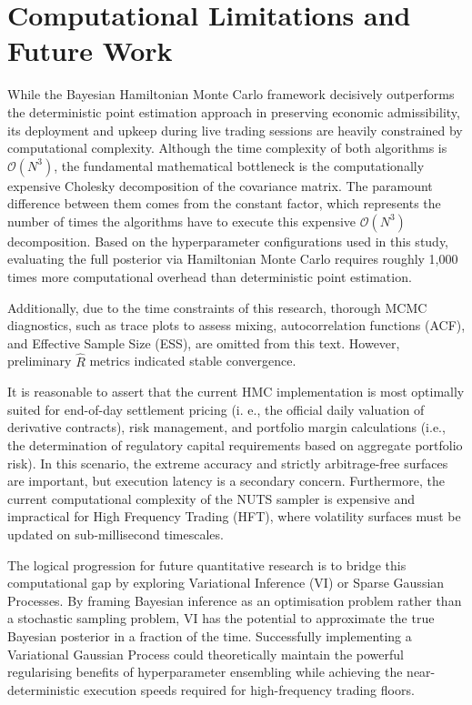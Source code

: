\documentclass[12pt,oneside]{report}
\theoremstyle{definition}
\theoremstyle{remark}
\begin{document}
\section{Computational Limitations and Future Work}
While the Bayesian Hamiltonian Monte Carlo framework decisively outperforms the deterministic point estimation approach in preserving economic admissibility, its deployment and upkeep during live trading sessions are heavily constrained by computational complexity. Although the time complexity of both algorithms is $\mathcal{O}(N^3)$, the fundamental mathematical bottleneck is the computationally expensive Cholesky decomposition of the covariance matrix. The paramount difference between them comes from the constant factor, which represents the number of times the algorithms have to execute this expensive $\mathcal{O}(N^3)$ decomposition. Based on the hyperparameter configurations used in this study, evaluating the full posterior via Hamiltonian Monte Carlo requires roughly 1,000 times more computational overhead than deterministic point estimation.

Additionally, due to the time constraints of this research, thorough MCMC diagnostics, such as trace plots to assess mixing, autocorrelation functions (ACF), and Effective Sample Size (ESS), are omitted from this text. However, preliminary $\hat{R}$ metrics indicated stable convergence.

It is reasonable to assert that the current HMC implementation is most optimally suited for end-of-day settlement pricing (i. e., the official daily valuation of derivative contracts), risk management, and portfolio margin calculations (i.e., the determination of regulatory capital requirements based on aggregate portfolio risk). In this scenario, the extreme accuracy and strictly arbitrage-free surfaces are important, but execution latency is a secondary concern. Furthermore, the current computational complexity of the NUTS sampler \cite{hoffman2014nuts} is expensive and impractical for High Frequency Trading (HFT), where volatility surfaces must be updated on sub-millisecond timescales.

The logical progression for future quantitative research is to bridge this computational gap by exploring Variational Inference (VI) or Sparse Gaussian Processes. By framing Bayesian inference as an optimisation problem rather than a stochastic sampling problem, VI has the potential to approximate the true Bayesian posterior in a fraction of the time. Successfully implementing a Variational Gaussian Process could theoretically maintain the powerful regularising benefits of hyperparameter ensembling while achieving the near-deterministic execution speeds required for high-frequency trading floors. 
\end{document}
